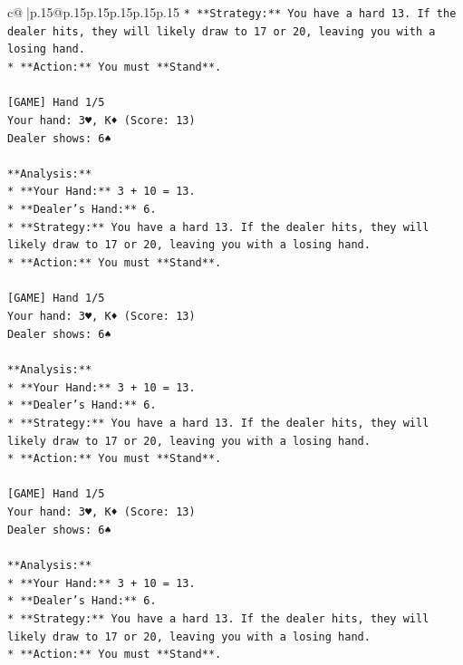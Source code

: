 \documentclass{article}
\begin{document}
{\begin{supertabular}{c@{$\;$}|p{.15\linewidth}@{}p{.15\linewidth}p{.15\linewidth}p{.15\linewidth}p{.15\linewidth}p{.15\linewidth}}
{{{\texttt{*   **Strategy:** You have a hard 13. If the dealer hits, they will likely draw to 17 or 20, leaving you with a losing hand.} \\
\texttt{*   **Action:** You must **Stand**.} \\
\\ 
\texttt{{[}GAME{]} Hand 1/5} \\
\texttt{Your hand: 3♥, K♦ (Score: 13)} \\
\texttt{Dealer shows: 6♠} \\
\\ 
\texttt{**Analysis:**} \\
\texttt{*   **Your Hand:** 3 + 10 = 13.} \\
\texttt{*   **Dealer's Hand:** 6.} \\
\texttt{*   **Strategy:** You have a hard 13. If the dealer hits, they will likely draw to 17 or 20, leaving you with a losing hand.} \\
\texttt{*   **Action:** You must **Stand**.} \\
\\ 
\texttt{{[}GAME{]} Hand 1/5} \\
\texttt{Your hand: 3♥, K♦ (Score: 13)} \\
\texttt{Dealer shows: 6♠} \\
\\ 
\texttt{**Analysis:**} \\
\texttt{*   **Your Hand:** 3 + 10 = 13.} \\
\texttt{*   **Dealer's Hand:** 6.} \\
\texttt{*   **Strategy:** You have a hard 13. If the dealer hits, they will likely draw to 17 or 20, leaving you with a losing hand.} \\
\texttt{*   **Action:** You must **Stand**.} \\
\\ 
\texttt{{[}GAME{]} Hand 1/5} \\
\texttt{Your hand: 3♥, K♦ (Score: 13)} \\
\texttt{Dealer shows: 6♠} \\
\\ 
\texttt{**Analysis:**} \\
\texttt{*   **Your Hand:** 3 + 10 = 13.} \\
\texttt{*   **Dealer's Hand:** 6.} \\
\texttt{*   **Strategy:** You have a hard 13. If the dealer hits, they will likely draw to 17 or 20, leaving you with a losing hand.} \\
\texttt{*   **Action:** You must **Stand**.} \\
}}}
\end{supertabular}}
\end{document}
